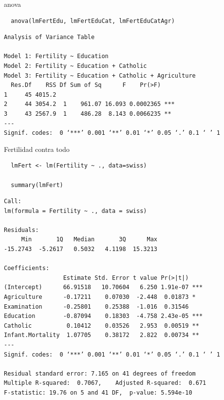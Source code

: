 \documentclass[xcolor={usenames,svgnames,dvipsnames}]{beamer}
\begin{document}
\begin{frame}[fragile,label=sec-3-8]{anova}
 \lstset{language=R,label= ,caption= ,numbers=none}
\begin{lstlisting}
  anova(lmFertEdu, lmFertEduCat, lmFertEduCatAgr)
\end{lstlisting}

\begin{verbatim}
Analysis of Variance Table

Model 1: Fertility ~ Education
Model 2: Fertility ~ Education + Catholic
Model 3: Fertility ~ Education + Catholic + Agriculture
  Res.Df    RSS Df Sum of Sq      F    Pr(>F)    
1     45 4015.2                                  
2     44 3054.2  1    961.07 16.093 0.0002365 ***
3     43 2567.9  1    486.28  8.143 0.0066235 ** 
---
Signif. codes:  0 ‘***’ 0.001 ‘**’ 0.01 ‘*’ 0.05 ‘.’ 0.1 ‘ ’ 1
\end{verbatim}
\end{frame}

\begin{frame}[fragile,label=sec-3-9]{Fertilidad contra todo}
 \lstset{language=R,label= ,caption= ,numbers=none}
\begin{lstlisting}
  lmFert <- lm(Fertility ~ ., data=swiss)
  
  summary(lmFert)
\end{lstlisting}

\begin{verbatim}
Call:
lm(formula = Fertility ~ ., data = swiss)

Residuals:
     Min       1Q   Median       3Q      Max 
-15.2743  -5.2617   0.5032   4.1198  15.3213 

Coefficients:
                 Estimate Std. Error t value Pr(>|t|)    
(Intercept)      66.91518   10.70604   6.250 1.91e-07 ***
Agriculture      -0.17211    0.07030  -2.448  0.01873 *  
Examination      -0.25801    0.25388  -1.016  0.31546    
Education        -0.87094    0.18303  -4.758 2.43e-05 ***
Catholic          0.10412    0.03526   2.953  0.00519 ** 
Infant.Mortality  1.07705    0.38172   2.822  0.00734 ** 
---
Signif. codes:  0 ‘***’ 0.001 ‘**’ 0.01 ‘*’ 0.05 ‘.’ 0.1 ‘ ’ 1

Residual standard error: 7.165 on 41 degrees of freedom
Multiple R-squared:  0.7067,	Adjusted R-squared:  0.671 
F-statistic: 19.76 on 5 and 41 DF,  p-value: 5.594e-10
\end{verbatim}
\end{frame}
\end{document}
